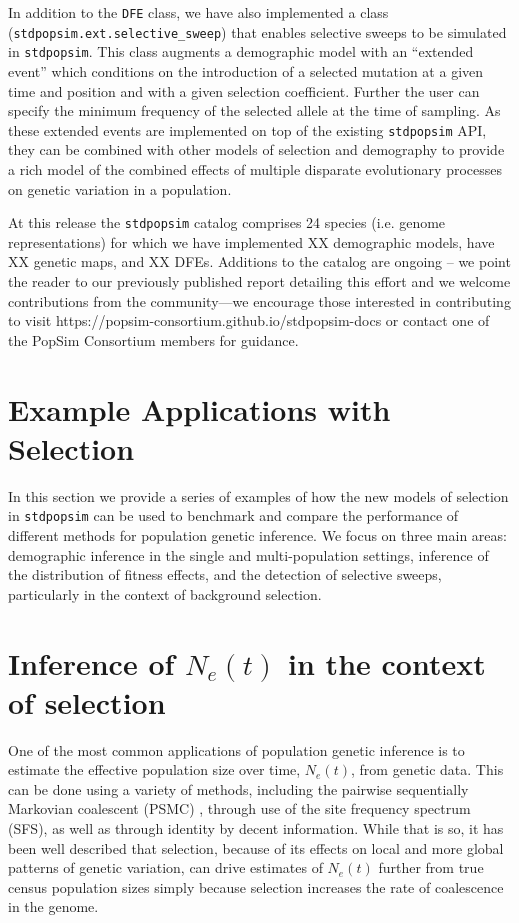 \documentclass[hidelinks]{article}
\newcommand{\stdpopsim}{\texttt{stdpopsim}\xspace}
\begin{document}
    In addition to the \texttt{DFE} class, we have also implemented a class (\texttt{stdpopsim.ext.selective\_sweep})
    that enables selective sweeps to be simulated in \stdpopsim.
    This class augments a demographic model with an ``extended event''
    which conditions on the introduction of a selected mutation at a given time and position
    and with a given selection coefficient. Further the user can specify the minimum frequency
    of the selected allele at the time of sampling. As these extended events are implemented
    on top of the existing \stdpopsim API, they can be combined with other models of selection
    and demography to provide a rich model of the combined effects of multiple disparate evolutionary processes
    on genetic variation in a population.
    
    At this release the \stdpopsim catalog comprises 24 species (i.e. genome representations)
    for which we have implemented XX demographic models, have XX genetic maps, and XX DFEs.
    Additions to the catalog are ongoing -- we point the reader to our previously published 
    report detailing this effort \citep{lauterbur2023expanding} and we welcome contributions from the
    community---we encourage those interested in contributing to visit https://popsim-consortium.github.io/stdpopsim-docs
    or contact one of the PopSim Consortium members for guidance.


    
\section*{Example Applications with Selection}
    \label{applications}
    In this section we provide a series of examples of how the new models of selection
    in \stdpopsim can be used to benchmark and compare the performance of different
    methods for population genetic inference.
    We focus on three main areas: demographic inference in the 
    single and multi-population settings, inference of the distribution of fitness effects,
    and the detection of selective sweeps, particularly in the context of background selection.

    \section*{Inference of $N_e(t)$ in the context of selection}
    One of the most common applications of population genetic inference is to estimate
    the effective population size over time, $N_e(t)$, from genetic data. This can be done
    using a variety of methods, including the pairwise sequentially Markovian coalescent
    (PSMC) \citep{li2011inference}, through use of the site frequency spectrum (SFS),
    as well as through identity by decent information. 
    While that is so, it has been well described that selection, because of its effects on
    local and more global patterns of genetic variation, can drive estimates of $N_e(t)$
    further from true census population sizes simply because selection increases the 
    rate of coalescence in the genome. 
\end{document}
